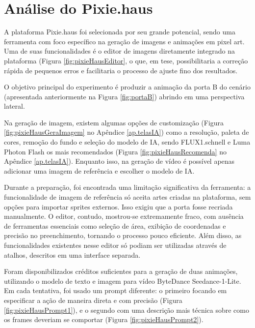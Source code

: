 \FloatBarrier
\section{Análise do Pixie.haus}
\label{s.pixieHaus}

A plataforma Pixie.haus foi selecionada por seu grande potencial, sendo uma ferramenta com foco específico na geração de imagens e animações em pixel art. Uma de suas funcionalidades é o editor de imagens diretamente integrado na plataforma (Figura \ref{fig:pixieHausEditor}, o que, em tese, possibilitaria a correção rápida de pequenos erros e facilitaria o processo de ajuste fino dos resultados.

O objetivo principal do experimento é produzir a animação da porta B do cenário (apresentada anteriormente na Figura \ref{fig:portaB}) abrindo em uma perspectiva lateral.

Na geração de imagem, existem algumas opções de customização (Figura \ref{fig:pixieHausGeraImagem} no Apêndice \ref{ap.telasIA}) como a resolução, paleta de cores,  remoção do fundo e seleção do modelo de IA, sendo FLUX1.schnell e Luma Photon Flash os mais recomendados (Figura \ref{fig:pixieHausRecomenda} no Apêndice \ref{ap.telasIA}). Enquanto isso, na geração de vídeo é possível apenas adicionar uma imagem de referência e escolher o modelo de IA. 

Durante a preparação, foi encontrada uma limitação significativa da ferramenta: a funcionalidade de imagem de referência só aceita artes criadas na plataforma, sem opções para importar sprites externos. Isso exigiu que a porta fosse recriada manualmente. O editor, contudo, mostrou-se extremamente fraco, com ausência de ferramentas essenciais como seleção de área, exibição de coordenadas e precisão no preenchimento, tornando o processo pouco eficiente. Além disso, as funcionalidades existentes nesse editor só podiam ser utilizadas através de atalhos, descritos em uma interface separada. 

Foram disponibilizados créditos suficientes para a geração de duas animações, utilizando o modelo de texto e imagem para vídeo ByteDance Seedance-1-Lite. Em cada tentativa, foi usado um prompt diferente: o primeiro focando em especificar a ação de maneira direta e com precisão (Figura \ref{fig:pixieHausPrompt1}), e o segundo com uma descrição mais técnica sobre como os frames deveriam se comportar (Figura \ref{fig:pixieHausPrompt2}).

